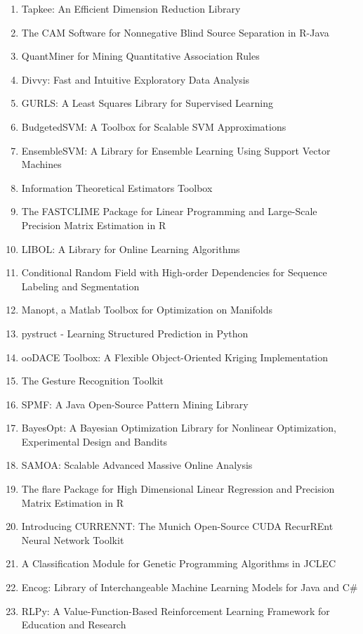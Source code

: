 \documentclass[a4paper,12pt,oneside]{book}
\begin{document}
\begin{enumerate}
\item Tapkee: An Efficient Dimension Reduction Library
\item The CAM Software for Nonnegative Blind Source Separation in R-Java
\item QuantMiner for Mining Quantitative Association Rules
\item Divvy: Fast and Intuitive Exploratory Data Analysis
\item GURLS: A Least Squares Library for Supervised Learning
\item BudgetedSVM: A Toolbox for Scalable SVM Approximations
\item EnsembleSVM: A Library for Ensemble Learning Using Support Vector Machines
\item Information Theoretical Estimators Toolbox
\item The FASTCLIME Package for Linear Programming and Large-Scale Precision Matrix Estimation in R
\item LIBOL: A Library for Online Learning Algorithms
\item Conditional Random Field with High-order Dependencies for Sequence Labeling and Segmentation
\item Manopt, a Matlab Toolbox for Optimization on Manifolds
\item pystruct - Learning Structured Prediction in Python
\item ooDACE Toolbox: A Flexible Object-Oriented Kriging Implementation
\item The Gesture Recognition Toolkit
\item SPMF: A Java Open-Source Pattern Mining Library
\item BayesOpt: A Bayesian Optimization Library for Nonlinear Optimization, Experimental Design and Bandits
\item SAMOA: Scalable Advanced Massive Online Analysis
\item The flare Package for High Dimensional Linear Regression and Precision Matrix Estimation in R
\item Introducing CURRENNT: The Munich Open-Source CUDA RecurREnt Neural Network Toolkit
\item A Classification Module for Genetic Programming Algorithms in JCLEC
\item Encog: Library of Interchangeable Machine Learning Models for Java and C\#
\item RLPy: A Value-Function-Based Reinforcement Learning Framework for Education and Research
\end{enumerate}
\end{document}
